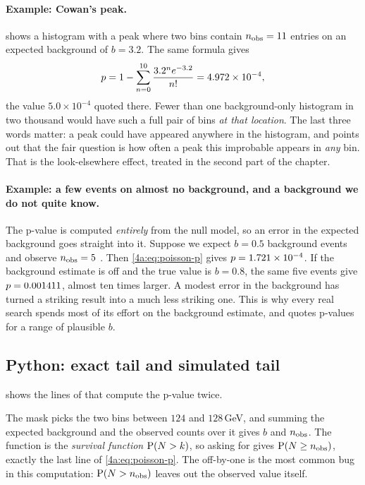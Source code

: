 \paragraph{Example: Cowan's peak.}
 shows a histogram with a peak where two bins
contain $n_{\rm obs}=11$ entries on an expected background of $b=3.2$. The
same formula gives
\[
  p=1-\sum_{n=0}^{10}\frac{3.2^n e^{-3.2}}{n!}=4.972\times10^{-4} ,
\]
the value $5.0\times10^{-4}$ quoted there. Fewer than one background-only
histogram in two thousand would have such a full pair of bins \emph{at that
location}. The last three words matter: a peak could have appeared anywhere
in the histogram, and  points out that the fair
question is how often a peak this improbable appears in \emph{any} bin. That
is the look-elsewhere effect, treated in the second part of the chapter.

\paragraph{Example: a few events on almost no background, and a background we
do not quite know.}
The p-value is computed \emph{entirely} from the null model, so an error in
the expected background goes straight into it. Suppose we expect $b=0.5$
background events and observe $n_{\rm obs}=5$ . Then
\eqref{4a:eq:poisson-p} gives $p=1.721\times10^{-4}$. If the background estimate
is off and the true value is $b=0.8$, the same five events give
$p=0.001411$, almost ten times larger. A modest error in the
background has turned a striking result into a much less striking one. This is
why every real search spends most of its effort on the background estimate,
and quotes p-values for a range of plausible $b$.

\subsection{Python: exact tail and simulated tail}
\label{4a:sec:bump-python}

 shows the lines of 
that compute the p-value twice.


The mask  picks the two bins between $124$ and $128\,$GeV, and
summing the expected background and the observed counts over it gives $b$
and $n_{\rm obs}$. The function  is the
\emph{survival function} $\operatorname{P}(N>k)$, so asking for
 gives $\operatorname{P}(N\ge n_{\rm obs})$, exactly the
last line of \eqref{4a:eq:poisson-p}. The off-by-one is the most common bug
in this computation: $\operatorname{P}(N>n_{\rm obs})$ leaves out the observed value
itself.

